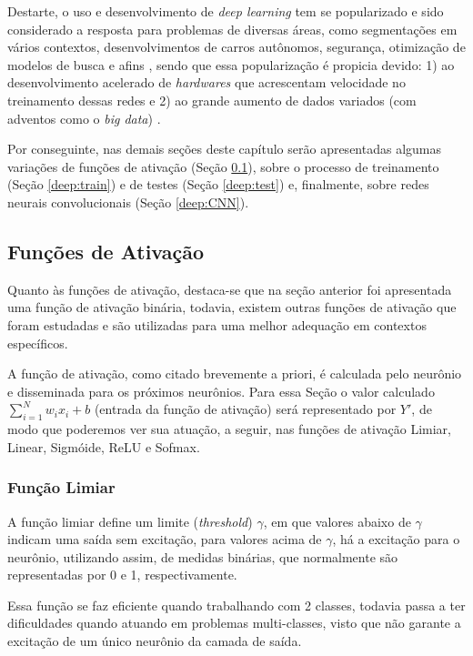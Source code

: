 Destarte, o uso e desenvolvimento de \textit{deep learning} tem se popularizado e sido considerado a resposta para problemas de diversas áreas, como segmentações em vários contextos, desenvolvimentos de carros autônomos, segurança, otimização de modelos de busca e afins \citep{Ghosh2019}, sendo que essa popularização é propicia devido: 1) ao desenvolvimento acelerado de \textit{hardwares} que acrescentam velocidade no treinamento dessas redes e 2) ao grande aumento de dados variados (com adventos como o \textit{big data}) \citep{Szegedy2015, ponti2018funciona}.

Por conseguinte, nas demais seções deste capítulo serão apresentadas algumas variações de funções de ativação (Seção \ref{deep:activation}), sobre o processo de treinamento (Seção \ref{deep:train}) e de testes (Seção \ref{deep:test}) e, finalmente, sobre redes neurais convolucionais (Seção \ref{deep:CNN}).


\subsection{Funções de Ativação}
\label{deep:activation}

Quanto às funções de ativação, destaca-se que na seção anterior foi apresentada uma função de ativação binária, todavia, existem outras funções de ativação que foram estudadas e são utilizadas para uma melhor adequação em contextos específicos.

A função de ativação, como citado brevemente a priori, é calculada pelo neurônio e disseminada para os próximos neurônios.  Para essa Seção o valor calculado $\sum_{i = 1}^{N} w_ix_i +b$ (entrada da função de ativação) será representado por $Y'$, de modo que poderemos ver sua atuação, a seguir, nas funções de ativação Limiar, Linear, Sigmóide, ReLU e Sofmax.


\subsubsection{Função Limiar}
A função limiar define um limite (\textit{threshold}) $\gamma$, em que valores abaixo de $\gamma$ indicam uma saída sem excitação, para valores acima de $\gamma$, há a excitação para o neurônio, utilizando assim, de medidas binárias, que normalmente são representadas por 0 e 1, respectivamente.

Essa função se faz eficiente quando trabalhando com 2 classes, todavia passa a ter dificuldades quando atuando em problemas multi-classes, visto que não garante a excitação de um único neurônio da camada de saída.

